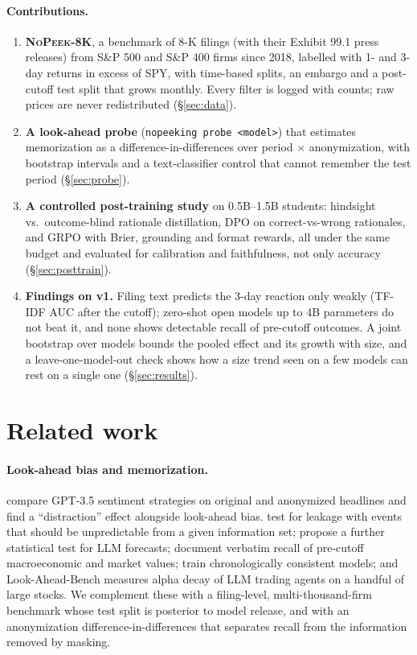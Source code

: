 \documentclass{article}
\newcommand{\dataset}{\textsc{NoPeek-8K}}
\begin{document}
\paragraph{Contributions.}
\begin{enumerate}[leftmargin=*,itemsep=2pt,topsep=2pt]
  \item \textbf{\dataset{}}, a benchmark of 8-K filings (with their Exhibit 99.1 press releases) from S\&P 500 and
  S\&P 400 firms since 2018, labelled with 1- and 3-day returns in excess of SPY, with time-based splits, an embargo
  and a post-cutoff test split that grows monthly. Every filter is logged with counts; raw prices are never
  redistributed (\S\ref{sec:data}).
  \item \textbf{A look-ahead probe} (\texttt{nopeeking probe <model>}) that estimates memorization as a
  difference-in-differences over period $\times$ anonymization, with bootstrap intervals and a text-classifier
  control that cannot remember the test period (\S\ref{sec:probe}).
  \item \textbf{A controlled post-training study} on 0.5B--1.5B students: hindsight vs.\ outcome-blind rationale
  distillation, DPO on correct-vs-wrong rationales, and GRPO with Brier, grounding and format rewards, all under the
  same budget and evaluated for calibration and faithfulness, not only accuracy (\S\ref{sec:posttrain}).
  \item \textbf{Findings on v1.} Filing text predicts the 3-day reaction only weakly (TF-IDF AUC
  \TfidfLrTestPostAuc{} after the cutoff); zero-shot open models up to 4B parameters do not beat it, and none shows
  detectable recall of pre-cutoff outcomes. A joint bootstrap over models bounds the pooled effect and its growth with
  size, and a leave-one-model-out check shows how a size trend seen on a few models can rest on a single one
  (\S\ref{sec:results}).
\end{enumerate}

\section{Related work}
\label{sec:related}

\paragraph{Look-ahead bias and memorization.}
\citet{glasserman2023lookahead} compare GPT-3.5 sentiment strategies on original and anonymized headlines and find a
``distraction'' effect alongside look-ahead bias. \citet{sarkar2025lookahead} test for leakage with events that
should be unpredictable from a given information set; \citet{gao2025detecting} propose a further statistical test for
LLM forecasts; \citet{lopezlira2025memorization} document verbatim recall of pre-cutoff macroeconomic and market
values; \citet{he2025chronologically} train chronologically consistent models; and Look-Ahead-Bench
\citep{benhenda2026lookahead} measures alpha decay of LLM trading agents on a handful of large stocks. We complement
these with a filing-level, multi-thousand-firm benchmark whose test split is posterior to model release, and with an
anonymization difference-in-differences that separates recall from the information removed by masking.
\end{document}
